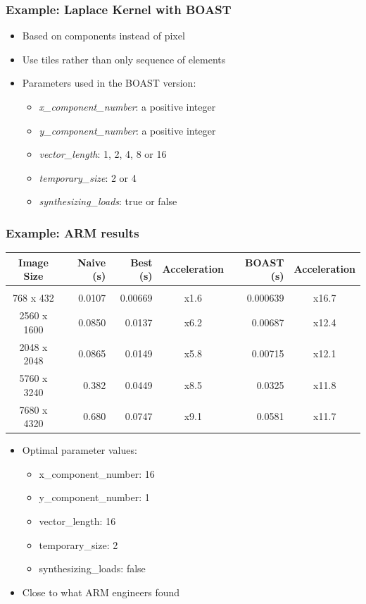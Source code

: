 \documentclass{beamer}
\begin{document}
\begin{frame}
  \frametitle{Example: Laplace Kernel with BOAST}
  \begin{itemize}
    \item Based on components instead of pixel
    \item Use tiles rather than only sequence of elements
    \item Parameters used in the BOAST version:
    \begin{itemize}
      \item \emph{x\_component\_number}: a positive integer
      \item \emph{y\_component\_number}: a positive integer
      \item \emph{vector\_length}: 1, 2, 4, 8 or 16
      \item \emph{temporary\_size}: 2 or 4
      \item \emph{synthesizing\_loads}: true or false
    \end{itemize}
  \end{itemize}
\end{frame}

\begin{frame}
  \frametitle{Example: ARM results}
  \begin{center}
  \scriptsize
  \begin{tabular}{c|r|r|c|r|c}
    Image Size  & Naive (s) & Best (s) & Acceleration & BOAST (s) & Acceleration \\
    \hline&&&&\\
  768 x 432   & 0.0107    & 0.00669  & x1.6         & 0.000639  & x16.7 \\
  2560 x 1600 & 0.0850    & 0.0137   & x6.2         & 0.00687   & x12.4 \\
  2048 x 2048 & 0.0865    & 0.0149   & x5.8         & 0.00715   & x12.1 \\
  5760 x 3240 & 0.382     & 0.0449   & x8.5         & 0.0325    & x11.8 \\
  7680 x 4320 & 0.680     & 0.0747   & x9.1         & 0.0581    & x11.7
  \end{tabular}
  \end{center}

  \begin{itemize}
    \item Optimal parameter values:
    \begin{itemize}
      \item x\_component\_number: 16
      \item y\_component\_number: 1
      \item vector\_length: 16
      \item temporary\_size: 2
      \item synthesizing\_loads: false
    \end{itemize}
    \item Close to what ARM engineers found
  \end{itemize}
\end{frame}
\end{document}
